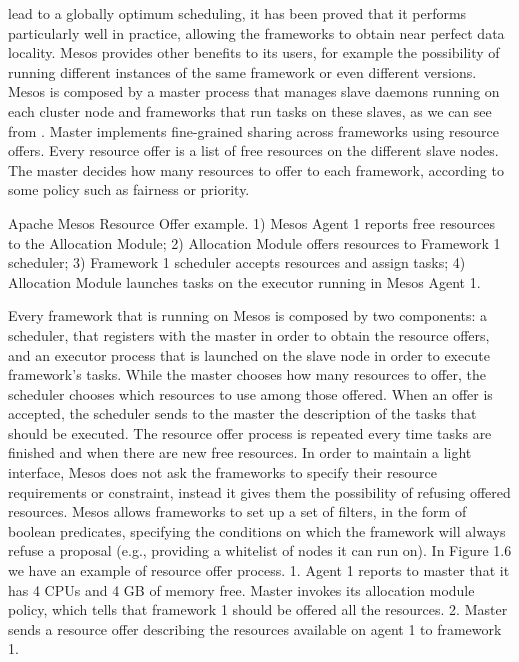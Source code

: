 lead to a globally optimum scheduling, it has been proved that it performs
particularly well in practice, allowing the frameworks to obtain
near perfect data locality. Mesos provides other benefits to its users,
for example the possibility of running different instances of the same
framework or even different versions.
Mesos is composed by a master process that manages slave daemons
running on each cluster node and frameworks that run tasks
on these slaves, as we can see from  . Master implements
fine-grained sharing across frameworks using resource offers. Every
resource offer is a list of free resources on the different slave nodes.
The master decides how many resources to offer to each framework,
according to some policy such as fairness or priority. 

Apache Mesos Resource Offer example. 1) Mesos Agent 1 reports
free resources to the Allocation Module; 2) Allocation
Module offers resources to Framework 1 scheduler; 3) Framework
1 scheduler accepts resources and assign tasks; 4) Allocation
Module launches tasks on the executor running in Mesos
Agent 1.

Every framework that is running on Mesos is composed by two components: a
scheduler, that registers with the master in order to obtain the resource
offers, and an executor process that is launched on the slave
node in order to execute framework’s tasks. While the master chooses
how many resources to offer, the scheduler chooses which resources
to use among those offered. When an offer is accepted, the scheduler
sends to the master the description of the tasks that should be
executed. The resource offer process is repeated every time tasks are
finished and when there are new free resources. In order to maintain
a light interface, Mesos does not ask the frameworks to specify
their resource requirements or constraint, instead it gives them the
possibility of refusing offered resources. Mesos allows frameworks to
set up a set of filters, in the form of boolean predicates, specifying
the conditions on which the framework will always refuse a proposal
(e.g., providing a whitelist of nodes it can run on).
In Figure 1.6 we have an example of resource offer process.
1. Agent 1 reports to master that it has 4 CPUs and 4 GB of memory
free. Master invokes its allocation module policy, which tells
that framework 1 should be offered all the resources.
2. Master sends a resource offer describing the resources available
on agent 1 to framework 1.


